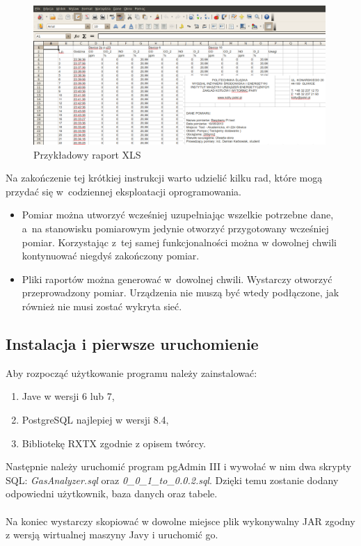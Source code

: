 \begin{figure}[!htb] 	\centering 	\includegraphics[width=0.99\textwidth]{images/xls} 	\caption{Przykładowy raport XLS} \label{reportXLSfinal} \end{figure} 

Na zakończenie tej krótkiej instrukcji warto udzielić kilku rad, które mogą przydać się w~codziennej eksploatacji oprogramowania.
\begin{itemize}
\item Pomiar można utworzyć wcześniej uzupełniając wszelkie potrzebne dane, a~na stanowisku pomiarowym jedynie otworzyć przygotowany wcześniej pomiar. Korzystając z~tej samej funkcjonalności można w dowolnej chwili kontynuować niegdyś zakończony pomiar.
\item Pliki raportów można generować w~dowolnej chwili. Wystarczy otworzyć przeprowadzony pomiar. Urządzenia nie muszą być wtedy podłączone, jak również nie musi zostać wykryta sieć.
\end{itemize}

\subsection{Instalacja i pierwsze uruchomienie}
Aby rozpocząć użytkowanie programu należy zainstalować:
\begin{enumerate}
\item Jave w wersji 6 lub 7,
\item PostgreSQL najlepiej w wersji 8.4,
\item Bibliotekę RXTX zgodnie z opisem twórcy.
\end{enumerate}

Następnie należy uruchomić program pgAdmin III i wywołać w nim dwa skrypty SQL: \textit{GasAnalyzer.sql} oraz \textit{0\_0\_1\_to\_0.0.2.sql}.
Dzięki temu zostanie dodany odpowiedni użytkownik, baza danych oraz tabele.
\\
\\
Na koniec wystarczy skopiować w dowolne miejsce plik wykonywalny JAR zgodny z wersją wirtualnej maszyny Javy i uruchomić go.